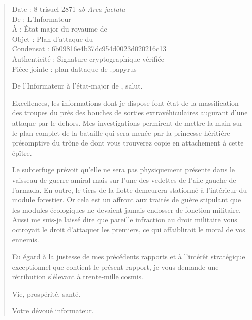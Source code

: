 \begin{quotation}
  \ttfamily\RaggedRight
  \noindent{}Date : 8 trisuel 2871 \emph{ab Arca jactata}%
  \\
  De : L’Informateur\\
  À : État-major du royaume de \campoppose{}\\
  Objet : Plan d’attaque du \campprincipal{}\\
  Condensat : 6b09816e4b37dc954d0023d020216c13\\
  Authenticité : Signature cryptographique vérifiée\\
  Pièce jointe : plan-dattaque-de-\campoppose{}.papyrus
  \nopagebreak\vspace{1em}

  De l’Informateur à l’état-major de \campoppose{}, salut.
  \nopagebreak\vspace{1em}

  Excellences, les informations dont je dispose font état de la massification des troupes du \campprincipal{} près des bouches de sorties extravéhiculaires augurant d’une attaque par le dehors. Mes investigations permirent de mettre la main sur le plan complet de la bataille qui sera menée par la princesse héritière présomptive du trône de \campprincipal{} dont vous trouverez copie en attachement à cette épître.

  Le subterfuge prévoit qu’elle ne sera pas physiquement présente dans le vaisseau de guerre amiral mais sur l’une des vedettes de l’aile gauche de l’armada. En outre, le tiers de la flotte demeurera stationné à l’intérieur du module forestier. Or cela est un affront aux traités de guère stipulant que les modules écologiques ne devaient jamais endosser de fonction militaire. Aussi me suis-je laissé dire que pareille infraction au droit militaire vous octroyait le droit d’attaquer les premiers, ce qui affaiblirait le moral de vos ennemis.

  Eu égard à la justesse de mes précédents rapports et à l’intérêt stratégique exceptionnel que contient le présent rapport, je vous demande une rétribution s’élevant à trente-mille cosmis.

  \nopagebreak\vspace{1em}
  Vie, prospérité, santé.

  \nopagebreak\vspace{1em}
  \hfill Votre dévoué informateur.
\end{quotation}


